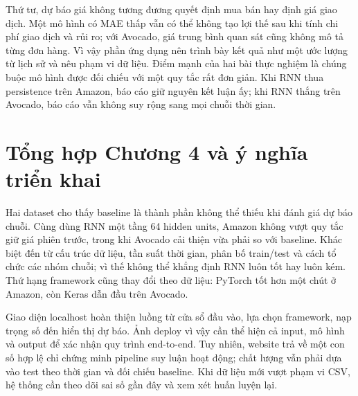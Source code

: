 \documentclass[12pt,a4paper]{report}
\begin{document}
Thứ tư, dự báo giá không tương đương quyết định mua bán hay định giá giao dịch. Một mô hình có MAE thấp vẫn có thể không tạo lợi thế sau khi tính chi phí giao dịch và rủi ro; với Avocado, giá trung bình quan sát cũng không mô tả từng đơn hàng. Vì vậy phần ứng dụng nên trình bày kết quả như một ước lượng từ lịch sử và nêu phạm vi dữ liệu. Điểm mạnh của hai bài thực nghiệm là chúng buộc mô hình được đối chiếu với một quy tắc rất đơn giản. Khi RNN thua persistence trên Amazon, báo cáo giữ nguyên kết luận ấy; khi RNN thắng trên Avocado, báo cáo vẫn không suy rộng sang mọi chuỗi thời gian.

\section{Tổng hợp Chương 4 và ý nghĩa triển khai}
Hai dataset cho thấy baseline là thành phần không thể thiếu khi đánh giá dự báo chuỗi. Cùng dùng RNN một tầng 64 hidden units, Amazon không vượt quy tắc giữ giá phiên trước, trong khi Avocado cải thiện vừa phải so với baseline. Khác biệt đến từ cấu trúc dữ liệu, tần suất thời gian, phân bố train/test và cách tổ chức các nhóm chuỗi; vì thế không thể khẳng định RNN luôn tốt hay luôn kém. Thứ hạng framework cũng thay đổi theo dữ liệu: PyTorch tốt hơn một chút ở Amazon, còn Keras dẫn đầu trên Avocado.

Giao diện localhost hoàn thiện luồng từ cửa sổ đầu vào, lựa chọn framework, nạp trọng số đến hiển thị dự báo. Ảnh deploy vì vậy cần thể hiện cả input, mô hình và output để xác nhận quy trình end-to-end. Tuy nhiên, website trả về một con số hợp lệ chỉ chứng minh pipeline suy luận hoạt động; chất lượng vẫn phải dựa vào test theo thời gian và đối chiếu baseline. Khi dữ liệu mới vượt phạm vi CSV, hệ thống cần theo dõi sai số gần đây và xem xét huấn luyện lại.
\end{document}
